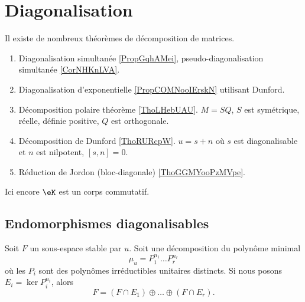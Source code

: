 \section{Diagonalisation}

Il existe de nombreux théorèmes de décomposition de matrices.
\begin{enumerate}
    \item
        Diagonalisation simultanée \ref{PropGqhAMei}, pseudo-diagonalisation simultanée \ref{CorNHKnLVA}.
    \item
        Diagonalisation d'exponentielle \ref{PropCOMNooIErskN} utilisant Dunford.
    \item
        Décomposition polaire théorème \ref{ThoLHebUAU}. \( M=SQ\), \( S\) est symétrique, réelle, définie positive, \( Q\) est orthogonale.
    \item
        Décomposition de Dunford \ref{ThoRURcpW}. \( u=s+n\) où \( s\) est diagonalisable et \( n\) est nilpotent, \( [s,n]=0\).
    \item 
        Réduction de Jordon (bloc-diagonale) \ref{ThoGGMYooPzMVpe}.
\end{enumerate}

Ici encore \( \eK\) est un corps commutatif.

\subsection{Endomorphismes diagonalisables}

\begin{lemma}       \label{LemgnaEOk}
    Soit \( F\) un sous-espace stable par \( u\). Soit une décomposition du polynôme minimal
    \begin{equation}
        \mu_u=P_1^{n_1}\ldots P_r^{n_r}
    \end{equation}
    où les \( P_i\) sont des polynômes irréductibles unitaires distincts. Si nous posons \( E_i=\ker P_i^{n_i}\), alors
    \begin{equation}
        F=(F\cap E_1)\oplus\ldots \oplus(F\cap E_r).
    \end{equation}
\end{lemma}

